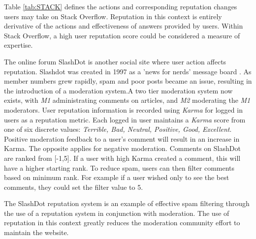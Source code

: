 

Table \ref{tab:STACK} defines the actions and corresponding reputation changes users may take on Stack Overflow. Reputation in this context is entirely derivative of the actions and effectiveness of answers provided by users. Within Stack Overflow, a high user reputation score could be considered a measure of expertise.

The online forum SlashDot \cite{slashdot_site} is another social site where user action affects reputation. Slashdot was created in 1997 as a 'news for nerds' message board \cite{josang2007survey}. As member numbers grew rapidly, spam and poor posts became an issue, resulting in the introduction of a moderation system.A two tier moderation system now exists, with \textit{M1} administrating comments on articles, and \textit{M2} moderating the \textit{M1} moderators. User reputation information is recorded using \textit{Karma} for logged in users as a reputation metric. Each logged in user maintains a \textit{Karma} score from one of six discrete values: \textit{Terrible, Bad, Neutral, Positive, Good, Excellent}. Positive moderation feedback to a user's comment will result in an increase in Karma. The opposite applies for negative moderation. Comments on SlashDot are ranked from [-1,5]. If a user with high Karma created a comment, this will have a higher starting rank. To reduce spam, users can then filter 
comments based on minimum rank. For example if a user wished only to see the best comments, they could set the filter value to 5. 

The SlashDot reputation system is an example of effective spam filtering through the use of a reputation system in conjunction with moderation. The use of reputation in this context greatly reduces the moderation community effort to maintain the website. 




